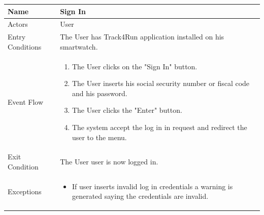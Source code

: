 \begin{enumerate}
\FloatBarrier
\begin{table}[h]
\begin{tabular}{|l|p{}|}
\hline
Name             & Sign In \\ \hline
Actors           & User  \\ \hline
Entry Conditions & The User has Track4Run application installed on his smartwatch.    \\ \hline
Event Flow       & \begin{enumerate}
            \item The User clicks on the "Sign In" button.
            \item The User inserts his social security number or fiscal code and his password.
            \item The User clicks the "Enter" button.
            \item The system accept the log in in request and redirect the user to the menu.
        \end{enumerate}\\ \hline
Exit Condition   & The User user is now logged in.\\ \hline
Exceptions       & \begin{itemize}
\item If user inserts invalid log in credentials a warning is generated saying the credentials are invalid.
\end{itemize}\\ \hline
\end{tabular}
\end{table}
\FloatBarrier


\end{enumerate}
